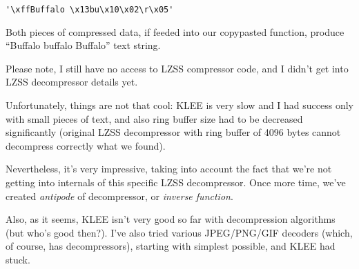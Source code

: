 \begin{lstlisting}
'\xffBuffalo \x13bu\x10\x02\r\x05'
\end{lstlisting}

Both pieces of compressed data, if feeded into our copypasted function, produce ``Buffalo buffalo Buffalo'' text string.

Please note, I still have no access to \ac{LZSS} compressor code, and I didn't get into \ac{LZSS} decompressor details yet.

Unfortunately, things are not that cool: 
KLEE is very slow and I had success only with small pieces of text, and also ring buffer size had to be decreased significantly
(original \ac{LZSS} decompressor with ring buffer of 4096 bytes cannot decompress correctly what we found).

Nevertheless, it's very impressive, taking into account the fact that we're not getting into internals of this specific LZSS decompressor.
Once more time, we've created \emph{antipode} of decompressor, or \emph{inverse function}.

Also, as it seems, KLEE isn't very good so far with decompression algorithms (but who's good then?).
I've also tried various JPEG/PNG/GIF decoders (which, of course, has decompressors), starting with simplest possible, and KLEE had stuck.


